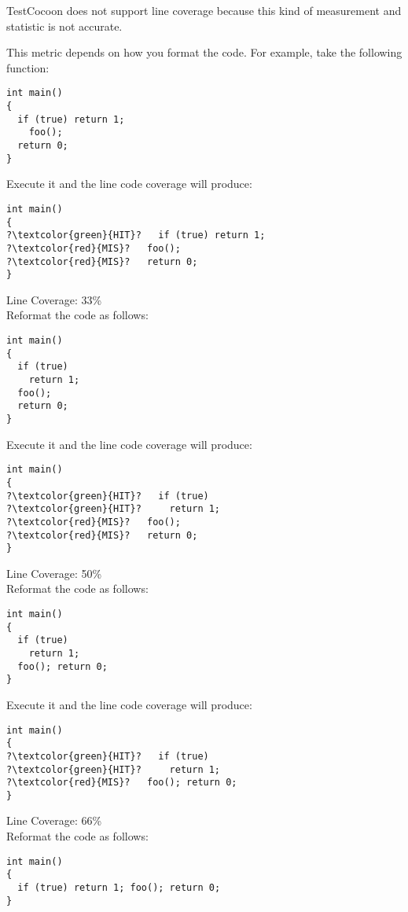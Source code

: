 


TestCocoon does not support line coverage because this
kind of measurement and statistic is not accurate. 


This metric  depends on how you format the code.
For example, take the following function:
\begin{lstlisting}
int main()
{
  if (true) return 1;
    foo();
  return 0;
}
\end{lstlisting}

Execute it and the line code coverage will produce:
\begin{lstlisting}[escapechar=?]
int main()
{
?\textcolor{green}{HIT}?   if (true) return 1;
?\textcolor{red}{MIS}?   foo();
?\textcolor{red}{MIS}?   return 0;
}
\end{lstlisting}
Line Coverage: 33\%\\

Reformat the code as follows:
\begin{lstlisting}[escapechar=?]
int main()
{
  if (true)
    return 1;
  foo();
  return 0;
}
\end{lstlisting}


Execute it and the line code coverage will produce:
\begin{lstlisting}[escapechar=?]
int main()
{
?\textcolor{green}{HIT}?   if (true)
?\textcolor{green}{HIT}?     return 1;
?\textcolor{red}{MIS}?   foo();
?\textcolor{red}{MIS}?   return 0;
}
\end{lstlisting}
Line Coverage: 50\%\\

Reformat the code as follows:
\begin{lstlisting}[escapechar=?]
int main()
{
  if (true)
    return 1;
  foo(); return 0;
}
\end{lstlisting}


Execute it and the line code coverage will produce:
\begin{lstlisting}[escapechar=?]
int main()
{
?\textcolor{green}{HIT}?   if (true)
?\textcolor{green}{HIT}?     return 1;
?\textcolor{red}{MIS}?   foo(); return 0;
}
\end{lstlisting}
Line Coverage: 66\%\\

Reformat the code as follows:
\begin{lstlisting}[escapechar=?]
int main()
{
  if (true) return 1; foo(); return 0;
}
\end{lstlisting}

